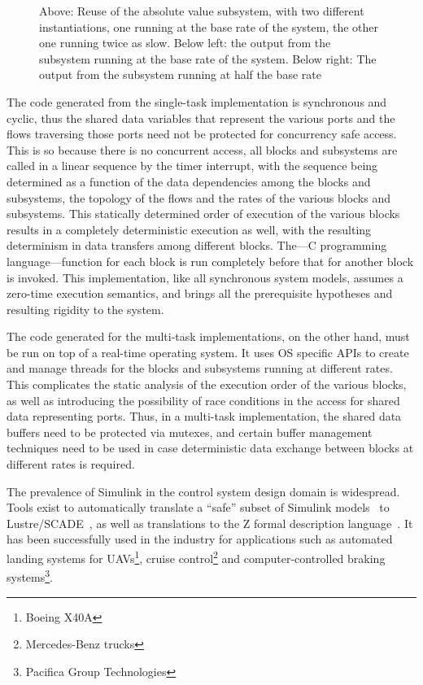 \begin{figure}
\caption[Simulink subsystem reuse.]{Above:
  Reuse of the absolute value subsystem, with two different
  instantiations, one running at the base rate of the system, the
  other one running twice as slow. Below left: the output from the
  subsystem running at the base rate of the system. Below right: The
  output from the subsystem running at half the base rate}
\label{fig:abs_output_graphs}
\end{figure}

The code generated from the single-task implementation is synchronous
and cyclic, thus the shared data variables that represent the various
ports and the flows traversing those ports need not be protected for
concurrency safe access. This is so because there is no concurrent
access, all blocks and subsystems are called in a linear sequence by
the timer interrupt, with the sequence being determined as a function
of the data dependencies among the blocks and subsystems, the topology
of the flows and the rates of the various blocks and subsystems. This
statically determined order of execution of the various blocks results
in a completely deterministic execution as well, with the resulting
determinism in data transfers among different blocks. The---C
programming language---function for each block is run completely
before that for another block is invoked. This implementation, like
all synchronous system models, assumes a zero-time execution
semantics, and brings all the prerequisite hypotheses and resulting
rigidity to the system.

The code generated for the multi-task implementations, on the other
hand, must be run on top of a real-time operating system. It uses OS
specific APIs to create and manage threads for the blocks and
subsystems running at different rates. This complicates the static
analysis of the execution order of the various blocks, as well as
introducing the possibility of race conditions in the access for
shared data representing ports. Thus, in a multi-task implementation,
the shared data buffers need to be protected via mutexes, and certain
buffer management techniques need to be used in case deterministic
data exchange between blocks at different rates is required.

The prevalence of Simulink in the control system design domain is
widespread. Tools exist to automatically translate a ``safe'' subset
of Simulink models~\cite{caspi@emsoft04} to
Lustre/SCADE~\cite{caspi@sigplan03}, as well as translations to the Z
formal description language~\cite{arthan@icfem00}. It has been
successfully used in the industry for applications such as automated
landing systems for UAVs\footnote{Boeing X40A}, cruise
control\footnote{Mercedes-Benz trucks} and computer-controlled braking
systems\footnote{Pacifica Group Technologies}.

